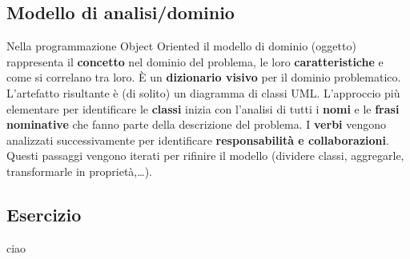 \documentclass{article}
\begin{document}
\subsection*{Modello di analisi/dominio}
\large

Nella programmazione Object Oriented il modello di dominio (oggetto) rappresenta il \textbf{concetto} nel dominio del problema, le loro \textbf{caratteristiche} e come si correlano tra loro. È un \textbf{dizionario visivo} per il dominio problematico. \vspace{14pt}\\
L'artefatto risultante è (di solito) un diagramma di classi UML. L'approccio più elementare per identificare le \textbf{classi} inizia con l'analisi di tutti i \textbf{nomi} e le \textbf{frasi nominative} che fanno parte della descrizione del problema. I \textbf{verbi} vengono analizzati successivamente per identificare \textbf{responsabilità e collaborazioni}. Questi passaggi vengono iterati per rifinire il modello (dividere classi, aggregarle, transformarle in proprietà,\dots).

\subsection*{Esercizio}
\large

ciao
\end{document}
